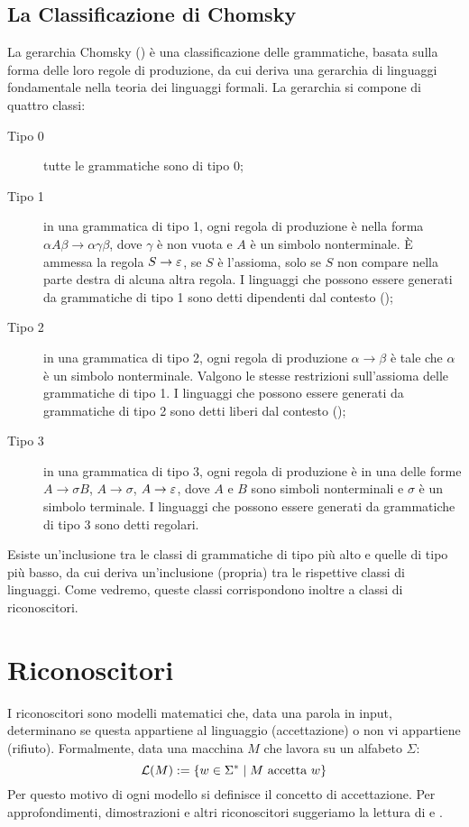 \subsection{La Classificazione di Chomsky}\label{subs:prel:chom}
La gerarchia Chomsky (\cite{Chomsky:56:hier}) è una classificazione delle grammatiche, basata sulla forma delle loro regole di produzione, da cui deriva una gerarchia di linguaggi fondamentale nella teoria dei linguaggi formali. La gerarchia si compone di quattro classi:
\begin{description}
	\item[Tipo 0] tutte le grammatiche sono di tipo 0;
	\item[Tipo 1] in una grammatica di tipo 1, ogni regola di produzione è nella forma $\alpha A\beta\to\alpha\gamma\beta$, dove $\gamma$ è non vuota e $A$ è un simbolo nonterminale. È ammessa la regola $S\to\varepsilon$, se $S$ è l'assioma, solo se $S$ non compare nella parte destra di alcuna altra regola. I linguaggi che possono essere generati da grammatiche di tipo 1 sono detti dipendenti dal contesto ();
	\item[Tipo 2] in una grammatica di tipo 2, ogni regola di produzione $\alpha\to\beta$ è tale che $\alpha$ è un simbolo nonterminale. Valgono le stesse restrizioni sull'assioma delle grammatiche di tipo 1. I linguaggi che possono essere generati da grammatiche di tipo 2 sono detti liberi dal contesto ();
	\item[Tipo 3] in una grammatica di tipo 3, ogni regola di produzione è in una delle forme $A\to\sigma B$, $A\to\sigma$, $A\to\varepsilon$, dove $A$ e $B$ sono simboli nonterminali e $\sigma$ è un simbolo terminale. I linguaggi che possono essere generati da grammatiche di tipo 3 sono detti regolari.
\end{description}
Esiste un'inclusione tra le classi di grammatiche di tipo più alto e quelle di tipo più basso, da cui deriva un'inclusione (propria) tra le rispettive classi di linguaggi. Come vedremo, queste classi corrispondono inoltre a classi di riconoscitori.



\section{Riconoscitori}
I riconoscitori sono modelli matematici che, data una parola in input, determinano se questa appartiene al linguaggio (accettazione) o non vi appartiene (rifiuto). Formalmente, data una macchina $M$ che lavora su un alfabeto $\Sigma$:
\begin{equation*}
	\mathcal L(M) := \left\{ w\in\Sigma^*\mid M\text{ accetta }w \right\}
\end{equation*}
Per questo motivo di ogni modello si definisce il concetto di accettazione.
Per approfondimenti, dimostrazioni e altri riconoscitori suggeriamo la lettura di \cite{Hopcroft:79:introLFA} e \cite{Shallit:09:secondLFA}.


